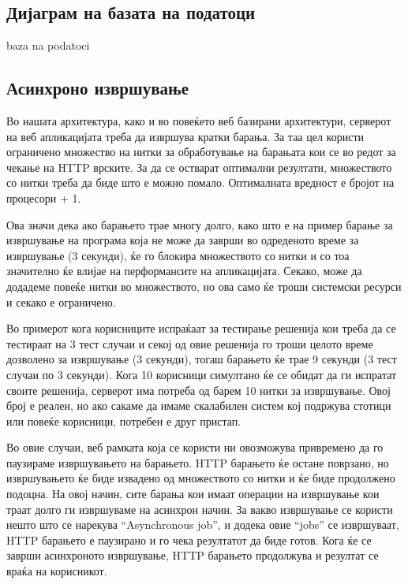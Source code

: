 \documentclass[a4paper,twocolumn]{article}
\begin{document}
\subsection{Дијаграм на базата на податоци}

baza na podatoci

\subsection{Асинхроно извршување}

Во нашата архитектура, како и во повеќето веб базирани архитектури, серверот на
веб апликацијата треба да извршува кратки барања. За таа цел користи ограничено
множество на нитки за обработување на барањата кои се во редот за чекање на HTTP
врските. За да се остварат оптимални резултати, множеството со нитки треба да
биде што е можно помало. Оптималната вредност е бројот на процесори + 1.

Ова значи дека ако барањето трае многу долго, како што е на пример барање за
извршување на програма која не може да заврши во одреденото време за извршување
(3 секунди), ќе го блокира множеството со нитки и со тоа значително ќе влијае на
перформансите на апликацијата. Секако, може да додадеме повеќе нитки во
множеството, но ова само ќе троши системски ресурси и секако е ограничено.

Во примерот кога корисниците испраќаат за тестирање решенија кои треба да се
тестираат на 3 тест случаи и секој од овие решенија го троши целото време
дозволено за извршување (3 секунди), тогаш барањето ќе трае 9 секунди (3 тест
случаи по 3 секунди). Кога 10 корисници симултано ќе се обидат да ги испратат
своите решенија, серверот има потреба од барем 10 нитки за извршување. Овој број
е реален, но ако сакаме да имаме скалабилен систем кој подржува стотици или
повеќе корисници, потребен е друг пристап.

Во овие случаи, веб рамката која се користи ни овозможува привремено да го
паузираме извршувањето на барањето. HTTP барањето ќе остане поврзано, но
извршувањето ќе биде извадено од множеството со нитки и ќе биде продолжено
подоцна. На овој начин, сите барања кои имаат операции на извршување кои траат
долго ги извршуваме на асинхрон начин. За вакво извршување се користи нешто што
се нарекува “Asynchronous job”, и додека овие “jobs” се извршуваат, HTTP
барањето е паузирано и го чека резултатот да биде готов. Кога ќе се заврши
асинхроното извршување, HTTP барањето продолжува и резултат се враќа на
корисникот.
\end{document}
